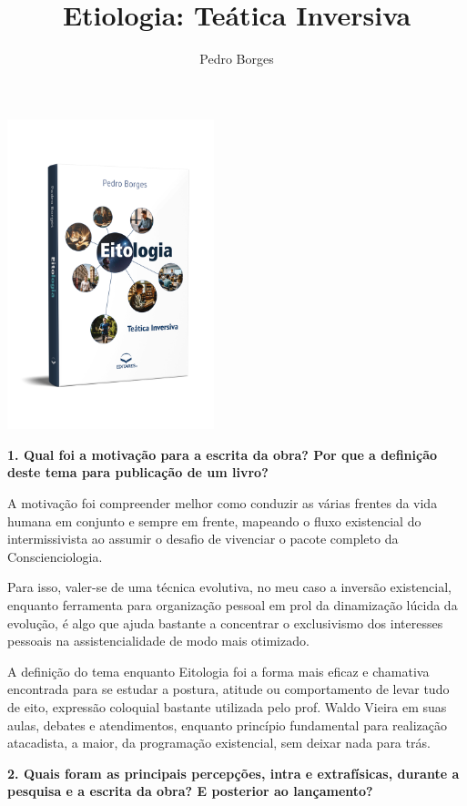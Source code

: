 \documentclass{gescons}
\author{Pedro Borges}
\title{Etiologia: Teática Inversiva}
\begin{document}
    \makeentrevistatitle

    \begin{multicols}{2}

\begin{center}
    \vspace{-0.5cm}
    \includegraphics[width=6cm]{articles/entrevista/mockups/Pedro_Borges.png}
\end{center}


\textbf{1.       Qual foi a motivação para a escrita da obra? Por que a definição deste tema para publicação de um livro?}

A motivação foi compreender melhor como conduzir as várias frentes da vida humana em conjunto e sempre em frente, mapeando o fluxo existencial do intermissivista ao assumir o desafio de vivenciar o pacote completo da Conscienciologia.

Para isso, valer-se de uma técnica evolutiva, no meu caso a inversão existencial, enquanto ferramenta para organização pessoal em prol da dinamização lúcida da evolução, é algo que ajuda bastante a concentrar o exclusivismo dos interesses pessoais na assistencialidade de modo mais otimizado.

A definição do tema enquanto Eitologia foi a forma mais eficaz e chamativa encontrada para se estudar a postura, atitude ou comportamento de levar tudo de eito, expressão coloquial bastante utilizada pelo prof. Waldo Vieira em suas aulas, debates e atendimentos, enquanto princípio fundamental para realização atacadista, a maior, da programação existencial, sem deixar nada para trás.

\textbf{2.       Quais foram as principais percepções, intra e extrafísicas, durante a pesquisa e a escrita da obra? E posterior ao lançamento?}


\end{multicols}
\end{document}

